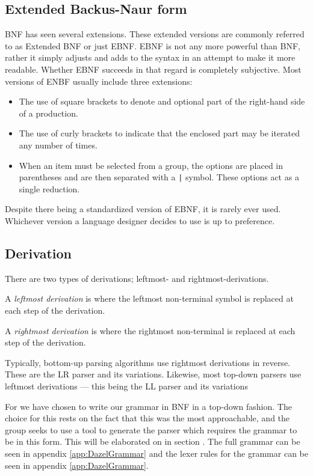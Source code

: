 \subsection{Extended Backus-Naur form}

BNF has seen several extensions.
These extended versions are commonly referred to as Extended BNF or just EBNF.
EBNF is not any more powerful than BNF, rather it simply adjusts and adds to the syntax in an attempt to make it more readable.
Whether EBNF succeeds in that regard is completely subjective.
Most versions of ENBF usually include three extensions:
\begin{itemize}
    \item The use of square brackets to denote and optional part of the right-hand side of a production.
    \item The use of curly brackets to indicate that the enclosed part may be iterated any number of times.
    \item When an item must be selected from a group, the options are placed in parentheses and are then separated with a \texttt{|} symbol. These options act as a single reduction.
\end{itemize}

Despite there being a standardized version of EBNF, it is rarely ever used. Whichever version a language designer decides to use is up to preference\cite{sebesta_concepts_2016}.

\subsection*{Derivation}

There are two types of derivations; leftmost- and rightmost-derivations\cite{sebesta_concepts_2016}.

A \textit{leftmost derivation} is where the leftmost non-terminal symbol is replaced at each step of the derivation.

A \textit{rightmost derivation} is where the rightmost non-terminal is replaced at each step of the derivation.

Typically, bottom-up parsing algorithms use rightmost derivations in reverse. These are the LR parser and its variations. Likewise, most top-down parsers use leftmost derivations — this being the LL parser and its variations

For \dazel{} we have chosen to write our grammar in BNF in a top-down fashion. The choice for this rests on the fact that this was the most approachable, and the group seeks to use a tool to generate the parser which requires the grammar to be in this form. This will be elaborated on in section . The full grammar can be seen in appendix \ref{app:DazelGrammar} and the lexer rules for the grammar can be seen in appendix \ref{app:DazelGrammar}.
